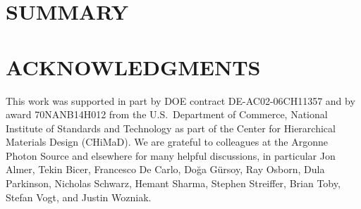 \documentclass{aip-cp}
\newcommand\ryan[1]{}
\newcommand\ryan[1]{{\color{green}[Ryan: #1]}}
\begin{document}

\section{SUMMARY}









\section{ACKNOWLEDGMENTS}

This work was supported in part by DOE contract DE-AC02-06CH11357 and by award 70NANB14H012 from the U.S.\  Department of Commerce, National Institute of Standards and Technology as part of the Center for Hierarchical Materials Design (CHiMaD).
We are grateful to colleagues at the Argonne Photon Source and elsewhere
for many helpful discussions, in particular Jon Almer, Tekin Bicer, Francesco De Carlo, Do{\u{g}}a G{\"u}rsoy, Ray Osborn, Dula Parkinson, Nicholas Schwarz, Hemant Sharma, Stephen Streiffer, Brian Toby, Stefan Vogt, and Justin Wozniak.


\nocite{*}
%
%
\end{document}
